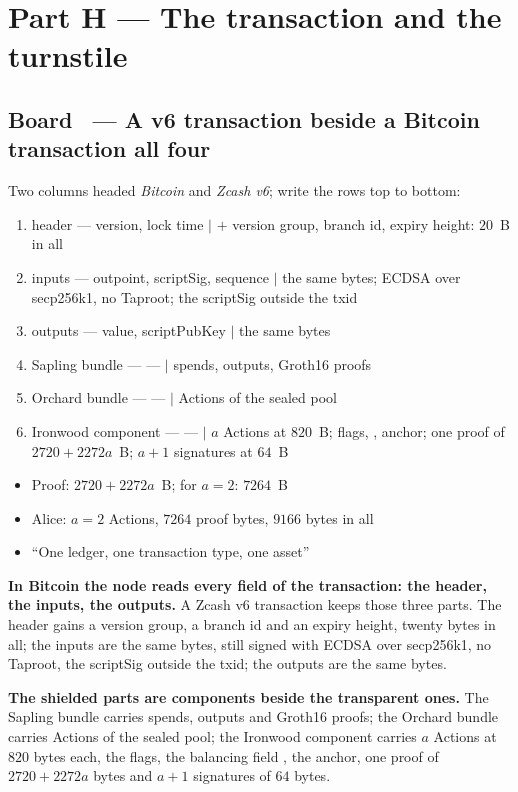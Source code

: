 \documentclass[11pt,a4paper]{article}
\makeatletter
\newcounter{board}
\newenvironment{board}[2]{\stepcounter{board}%
  \subsection*{Board \theboard\ --- #1 \hfill {\normalfont\small\color{arb}#2}}}{\medskip}
\newcommand{\Draw}{\draw@head{Draw}}
\newcommand{\Write}{\draw@head{Write}}
\newcommand{\Say}{\draw@head{Say}}
\makeatother
\begin{document}
\section{Part H --- The transaction and the turnstile}

\begin{board}{A v6 transaction beside a Bitcoin transaction}{all four}
\Draw
Two columns headed \emph{Bitcoin} and \emph{Zcash v6}; write the rows
top to bottom:
\begin{enumerate}
  \item header --- version, lock time $\mid$ $+$ version group, branch
    id, expiry height: $20$~B in all
  \item inputs --- outpoint, scriptSig, sequence $\mid$ the same bytes;
    ECDSA over secp256k1, no Taproot; the scriptSig outside the txid
  \item outputs --- value, scriptPubKey $\mid$ the same bytes
  \item Sapling bundle --- --- $\mid$ spends, outputs, Groth16 proofs
  \item Orchard bundle --- --- $\mid$ Actions of the sealed pool
  \item Ironwood component --- --- $\mid$ $a$ Actions at $820$~B; flags,
    \wbHvbi, anchor; one proof of $2720 + 2272a$~B; $a + 1$ signatures
    at $64$~B
\end{enumerate}
\Write
\begin{itemize}
  \item Proof: $2720 + 2272a$~B; for $a = 2$: $7264$~B
  \item Alice: $a = 2$ Actions, $7264$ proof bytes, $9166$ bytes in all
  \item ``One ledger, one transaction type, one asset''
\end{itemize}
\Say
\textbf{In Bitcoin the node reads every field of the transaction: the
header, the inputs, the outputs.} A Zcash v6 transaction keeps those three
parts. The header gains a version group, a branch id and an expiry
height, twenty bytes in all; the inputs are the same bytes, still signed
with ECDSA over secp256k1, no Taproot, the scriptSig outside the txid; the
outputs are the same bytes.

\textbf{The shielded parts are components beside the transparent ones.}
The Sapling bundle carries spends, outputs and Groth16 proofs; the
Orchard bundle carries Actions of the sealed pool; the Ironwood component
carries $a$ Actions at $820$ bytes each, the flags, the balancing field
\wbHvbi, the anchor, one proof of $2720 + 2272a$ bytes and $a + 1$
signatures of $64$ bytes.


\end{board}
\end{document}
